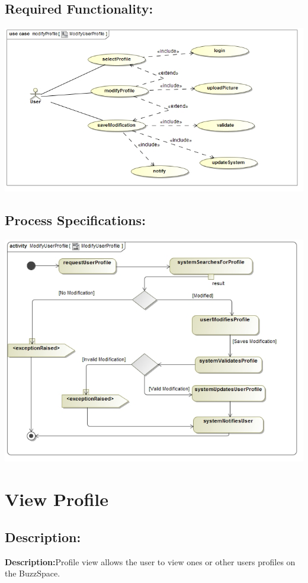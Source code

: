 \documentclass[a4paper,11pt]{article}
\begin{document}
\subsection{Required Functionality:}
\includegraphics[width=1\linewidth]{./Images/UserProfile/ModifyUserProfileUseCase}
\subsection{Process Specifications:} 
\includegraphics[width=1\linewidth]{./Images/UserProfile/ModifyUserProfileActivity}


\section{View Profile}
\subsection*{Description:}
\textbf{Description:}Profile view allows the user to view ones or other users profiles on the BuzzSpace.
\end{document}
